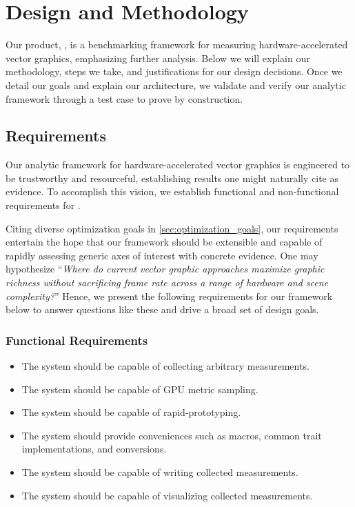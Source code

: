 \chapter{Design and Methodology}\label{sec:methodology}
Our product, \toolname, is a benchmarking framework for measuring hardware-accelerated vector graphics, emphasizing further analysis. Below we will explain our methodology, steps we take, and justifications for our design decisions. Once we detail our goals and explain our architecture, we validate and verify our analytic framework through a test case to prove by construction.\medskip

\section{Requirements}
Our analytic framework for hardware-accelerated vector graphics is engineered to be trustworthy and resourceful, establishing results one might naturally cite as evidence. To accomplish this vision, we establish functional and non-functional requirements for \toolname.\medskip

Citing diverse optimization goals in \cref{sec:optimization_goals}, our requirements entertain the hope that our framework should be extensible and capable of rapidly assessing generic axes of interest with concrete evidence. One may hypothesize ``\textit{Where do current vector graphic approaches maximize graphic richness without sacrificing frame rate across a range of hardware and scene complexity?}'' Hence, we present the following requirements for our framework below to answer questions like these and drive a broad set of design goals.\medskip

\subsection{Functional Requirements}
\begin{itemize}
	\item The system should be capable of collecting arbitrary measurements.
	\item The system should be capable of GPU metric sampling.
	\item The system should be capable of rapid-prototyping.
	\item The system should provide conveniences such as macros, common trait implementations, and conversions.
	\item The system should be capable of writing collected measurements.
	\item The system should be capable of visualizing collected measurements.
\end{itemize}

